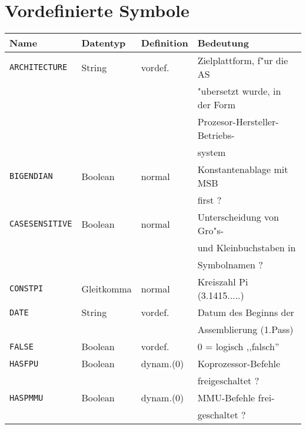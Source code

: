 \documentclass[12pt,a4paper,twoside]{report}
\newcommand{\tty}[1]{{\tt #1}}
\begin{document}
{


\cleardoublepage
\chapter{Vordefinierte Symbole}\label{AppInternSyms}

\begin{table*}[ht]
\begin{center}\begin{tabular}{|l|l|l|l|}
\hline
Name             &  Datentyp   & Definition & Bedeutung \\
\hline\hline
\tty{ARCHITECTURE} & String    & vordef.    & Zielplattform, f"ur die AS \\
                 &             &            & "ubersetzt wurde, in der Form \\
                 &             &            & Prozesor-Hersteller-Betriebs- \\
                 &             &            & system \\
\hline
\tty{BIGENDIAN}  &  Boolean    & normal     & Konstantenablage mit MSB \\
                 &             &            & first ? \\
\hline
\tty{CASESENSITIVE} & Boolean  & normal     & Unterscheidung von Gro"s- \\
                 &             &            & und Kleinbuchstaben in \\
                 &             &            & Symbolnamen ? \\
\hline
\tty{CONSTPI}    &  Gleitkomma & normal     & Kreiszahl Pi (3.1415.....) \\
\hline
\tty{DATE}       &  String     & vordef.    & Datum des Beginns der  \\
                 &             &            & Assemblierung (1.Pass) \\
\hline
\tty{FALSE}      &  Boolean    & vordef.    & 0 = logisch ,,falsch'' \\
\hline
\tty{HASFPU}     &  Boolean    & dynam.(0)  & Koprozessor-Befehle \\
                 &             &            & freigeschaltet ? \\
\hline
\tty{HASPMMU}    &  Boolean    & dynam.(0)  & MMU-Befehle frei- \\
                 &             &            & geschaltet ? \\

\end{tabular}
\end{center}
\end{table*}}
\end{document}
